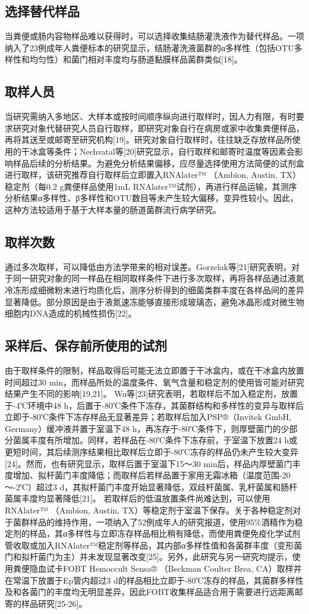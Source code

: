 \subsection{选择替代样品}
当粪便或肠内容物样品难以获得时，可以选择收集结肠灌洗液作为替代样品。一项纳入了23例成年人粪便标本的研究显示，结肠灌洗液菌群的α多样性（包括OTU多样性和均匀性）和菌门相对丰度均与肠道黏膜样品菌群类似[18]。
\subsection{取样人员}
当研究需纳入多地区、大样本或按时间顺序纵向进行取样时，因人力有限，有时要求研究对象代替研究人员自行取样，即研究对象自行在病房或家中收集粪便样品，再将其送至或邮寄至研究机构[19]。研究对象自行取样时，往往缺乏存放样品所使用的干冰盒等条件；Nechvatal等[20]研究显示，自行取样和邮寄时温度等因素会影响样品后续的分析结果。为避免分析结果偏移，应尽量选择使用方法简便的试剂盒进行取样，该研究推荐自行取样后立即置入RNAlater™ （Ambion, Austin, TX）稳定剂（每0.2 g粪便样品使用1mL RNAlater™试剂），再进行样品运输，其测序分析结果α多样性、β多样性和OTU数目等未产生较大偏移，变异性较小。因此，这种方法较适用于基于大样本量的肠道菌群流行病学研究。
\subsection{取样次数}
通过多次取样，可以降低由方法学带来的相对误差。Gorzelak等[21]研究表明，对于同一研究对象的同一样品在相同取样条件下进行多次取样，再将各样品通过液氮冷冻形成细微粉末进行均质化后，测序分析得到的细菌类群丰度在各样品间的差异显著降低。部分原因是由于液氮速冻能够直接形成玻璃态，避免冰晶形成对微生物细胞内DNA造成的机械性损伤[22]。
\subsection{采样后、保存前所使用的试剂}
由于取样条件的限制，样品取得后可能无法立即置于干冰盒内，或在干冰盒内放置时间超过30 min，而样品所处的温度条件、氧气含量和稳定剂的使用皆可能对研究结果产生不同的影响[19,21]。
Wu等[23]研究表明，若取样后不加入稳定剂，放置于-4℃环境中48 h，后置于-80℃条件下冻存，其菌群结构和多样性的变异与取样后立即于-80℃条件下冻存样品无显著差异；若取样后加入PSP®（Invitek GmbH, Germany）缓冲液并置于室温下48 h，再冻存于-80℃条件下，则厚壁菌门的少部分菌属丰度有所增加。同样，若样品在-80℃条件下冻存前，于室温下放置24 h或更短时间，其后续测序结果相比取样后立即于-80℃冻存的样品仍未产生较大变异[24]。然而，也有研究显示，取样后置于室温下15～30 min后，样品内厚壁菌门丰度增加、拟杆菌门丰度降低；而取样后若样品置于家用无霜冰箱（温度范围-20～-2℃）超过3 d，其拟杆菌门丰度开始显著降低，双歧杆菌属、乳杆菌属和肠杆菌属丰度均显著降低[21]。
若取样后的低温放置条件尚难达到，可以使用RNAlater™ （Ambion, Austin, TX）等稳定剂于室温下保存。关于各种稳定剂对于菌群样品的维持作用，一项纳入了52例成年人的研究报道，使用95\%酒精作为稳定剂的样品，其α多样性与立即冻存样品相比稍有降低，而使用粪便免疫化学试剂管收取或加入RNAlater™稳定剂等样品，其内部α多样性值和各菌群丰度（变形菌门和拟杆菌门为主）并未发现显著改变[25]。另外，此研究与另一研究均提示，使用粪便隐血试卡FOBT Hemoccult Sensa® （Beckman Coulter Brea, CA）取样并在常温下放置于Ep管内超过3 d的样品相比立即于-80℃冻存的样品，其菌群多样性及和各菌门的丰度均无明显差异，因此FOBT收集样品适合用于需要进行远距离邮寄的样品研究[25-26]。
